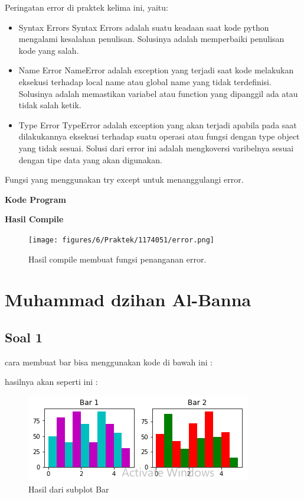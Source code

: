 \hfill \break
Peringatan error di praktek kelima ini, yaitu:
\begin{itemize}
	\item Syntax Errors
	Syntax Errors adalah suatu keadaan saat kode python mengalami kesalahan penulisan. Solusinya adalah memperbaiki penulisan kode yang salah.
	
	\item Name Error
	NameError adalah exception yang terjadi saat kode melakukan eksekusi terhadap local name atau global name yang tidak terdefinisi. Solusinya adalah memastikan variabel atau function yang dipanggil ada atau tidak salah ketik.
	
	\item Type Error
	TypeError adalah exception yang akan terjadi apabila pada saat dilakukannya eksekusi terhadap suatu operasi atau fungsi dengan type object yang tidak sesuai. Solusi dari error ini adalah mengkoversi varibelnya sesuai dengan tipe data yang akan digunakan.
\end{itemize}
\hfill \break
Fungsi yang menggunakan try except untuk menanggulangi error.

\hfill \break
\textbf{Kode Program}



\hfill \break
\textbf{Hasil Compile}

\begin{figure}[H]
	\texttt{[image: figures/6/Praktek/1174051/error.png]}
	\centering
	\caption{Hasil compile membuat fungsi penanganan error.}
\end{figure}
\section{Muhammad dzihan Al-Banna}
\subsection{Soal 1}
cara membuat bar bisa menggunakan kode di bawah ini :

hasilnya akan seperti ini :
\begin{figure}[h]
\centering
\includegraphics[scale=0.9]{figures/6/Praktek/1174095/bardz.png}
\caption{Hasil dari subplot Bar}
\label{fig:contoh}
\end{figure}
